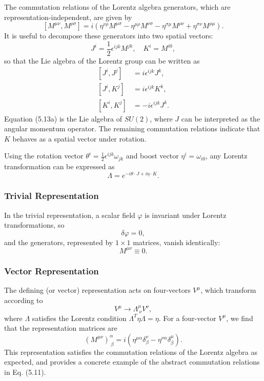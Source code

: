 The commutation relations of the Lorentz algebra generators, which are representation-independent, are given by
\[
[M^{\mu \nu}, M^{\rho \sigma}] = i \left( \eta^{\nu \rho} M^{\mu \sigma} - \eta^{\mu \rho} M^{\nu \sigma} - \eta^{\sigma \mu} M^{\rho \nu} + \eta^{\sigma \nu} M^{\rho \mu} \right).
\]
It is useful to decompose these generators into two spatial vectors:
\[
J^i = \frac{1}{2} \epsilon^{ijk} M^{jk}, \quad K^i = M^{i0},
\]
so that the Lie algebra of the Lorentz group can be written as
\begin{subequations}
    \begin{align}
        [J^i, J^j] &= i \epsilon^{ijk} J^k, \\
        [J^i, K^j] &= i \epsilon^{ijk} K^k, \\
        [K^i, K^j] &= -i \epsilon^{ijk} J^k.
    \end{align}
\end{subequations}
Equation (5.13a) is the Lie algebra of $SU(2)$, where $J$ can be interpreted as the angular momentum operator. The remaining commutation relations indicate that $K$ behaves as a spatial vector under rotation.

Using the rotation vector $\theta^i = \frac{1}{2} \epsilon^{ijk} \omega_{jk}$ and boost vector $\eta^i = \omega_{i0}$, any Lorentz transformation can be expressed as
\[
\Lambda = e^{-i \theta \cdot J + i \eta \cdot K}.
\]

\subsubsection{Trivial Representation}

In the trivial representation, a scalar field $\varphi$ is invariant under Lorentz transformations, so
\[
\delta \varphi = 0,
\]
and the generators, represented by $1 \times 1$ matrices, vanish identically:
\[
M^{\mu \nu} \equiv 0.
\]

\subsubsection{Vector Representation}

The defining (or vector) representation acts on four-vectors $V^\mu$, which transform according to
\[
V^\mu \to \Lambda^\mu_{\ \nu} V^\nu,
\]
where $\Lambda$ satisfies the Lorentz condition $\Lambda^T \eta \Lambda = \eta$. For a four-vector $V^\mu$, we find that the representation matrices are
\[
(M^{\mu \nu})^\alpha_{\ \beta} = i \left( \eta^{\mu \alpha} \delta^\nu_\beta - \eta^{\nu \alpha} \delta^\mu_\beta \right).
\]
This representation satisfies the commutation relations of the Lorentz algebra as expected, and provides a concrete example of the abstract commutation relations in Eq. (5.11).

